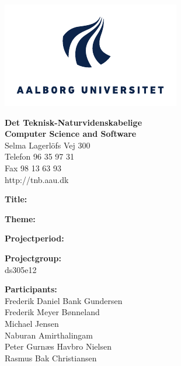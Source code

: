 \begin{titlepage}
	\begin{minipage}{0.40\textwidth}
		\includegraphics[width=\textwidth]{Images/aau-logo-new.pdf}
	\end{minipage}
	\hfill
	\begin{minipage}{0.40\textwidth}
		{\sf\small \textbf{Det Teknisk-Naturvidenskabelige}} \\
		{\sf\small \textbf{Computer Science and Software}} \\
		{\sf\small Selma Lagerlöfs Vej 300} \\
		{\sf\small Telefon 96 35 97 31} \\
		{\sf\small Fax 98 13 63 93} \\
		{\sf\small http://tnb.aau.dk}
	\end{minipage}

	\begin{minipage}{0.4\textwidth}
		\begin{description}
			\vspace{1cm}
			\item {\bf Title:}\\ \rtitle
			\item {\bf Theme:}\\ \rtheme 
			\item {\bf Projectperiod:}\\ \rperiod
			\item {\bf Projectgroup:}\\ ds305e12
			\item {\bf Participants:}\\
			Frederik Daniel Bank Gundersen\\
			Frederik Meyer Bønneland\\
			Michael Jensen\\
			Naburan Amirthalingam\\
			Peter Gurnæs Havbro Nielsen\\
			Rasmus Bak Christiansen\\


\end{description}
\end{minipage}
\end{titlepage}
